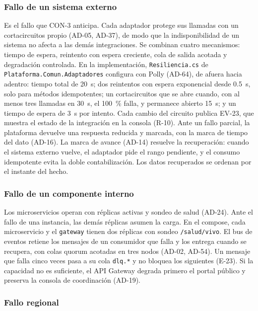 \documentclass[11pt,letterpaper]{article}
\providecommand{\br}{\discretionary{}{}{}}
\begin{document}
\subsubsection*{Fallo de un sistema externo}

Es el fallo que CON-3 anticipa. Cada adaptador protege sus
llamadas con un cortacircuitos propio (AD-05, AD-37), de modo que la indisponibilidad de un
sistema no afecta a las demás integraciones. Se combinan cuatro mecanismos: tiempo de
espera, reintento con espera creciente, cola de salida acotada y degradación controlada. En la
implementación, \texttt{Resiliencia.\br{}cs} de \texttt{Plataforma.\br{}Comun.\br{}Adaptadores} configura con
Polly (AD-64), de afuera hacia adentro: tiempo total de \qty{20}{\second}; dos reintentos con
espera exponencial desde \qty{0,5}{\second}, solo para métodos idempotentes; un cortacircuitos
que se abre cuando, con al menos tres llamadas en \qty{30}{\second}, el \qty{100}{\percent} falla,
y permanece abierto
\qty{15}{\second}; y un tiempo de espera de \qty{3}{\second} por intento. Cada cambio del circuito
publica EV-23, que muestra el estado de la integración en la consola (R-10).
Ante un fallo parcial, la plataforma devuelve una respuesta reducida y marcada, con la marca
de tiempo del dato (AD-16). La marca de avance (AD-14) resuelve la recuperación: cuando el
sistema externo vuelve, el adaptador pide el rango pendiente, y el consumo idempotente
evita la doble contabilización. Los datos recuperados se ordenan por el instante del hecho.
\subsubsection*{Fallo de un componente interno}

Los microservicios operan con réplicas activas y sondeo de
salud (AD-24). Ante el fallo de una instancia, las demás réplicas asumen la carga. En el compose,
cada microservicio y el \texttt{gateway} tienen dos réplicas con sondeo \texttt{/salud/vivo}. El
bus de eventos retiene los mensajes de un consumidor que falla y los entrega cuando se recupera,
con colas quorum acotadas en tres nodos (AD-02, AD-54). Un mensaje que falla cinco veces pasa a
su cola \texttt{dlq.*} y no bloquea los siguientes (E-23). Si la capacidad no es suficiente, el API Gateway degrada primero
el portal público y preserva la consola de coordinación (AD-19).
\subsubsection*{Fallo regional}
\end{document}

